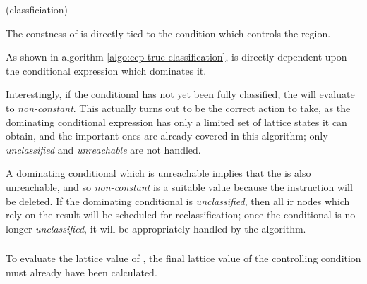 \begin{algorithm}[h!]
  \label{algo:ccp-true-classification}
  \caption{ (classficiation)}
  \begin{algorithmic}[1]
    \STATE{}
    \STATE{}
    \STATE{}
    \ELSE
    \ENDIF
  \end{algorithmic}
\end{algorithm}

\begin{observation}\label{obs:ccp-true-guard}
  The constness of  is directly tied to the condition
  which controls the region.
\end{observation}

As shown in algorithm \ref{algo:ccp-true-classification},
 is directly dependent upon the conditional expression
which dominates it.

Interestingly, if the conditional has not yet been fully classified,
the  will evaluate to \emph{non-constant}.  This
actually turns out to be the correct action to take, as the dominating
conditional expression has only a limited set of lattice states it can
obtain, and the important ones are already covered in this algorithm;
only \emph{unclassified} and \emph{unreachable} are not handled.

A dominating conditional which is unreachable implies that the
 is also unreachable, and so \emph{non-constant} is a
suitable value because the instruction will be deleted.  If the
dominating conditional is \emph{unclassified}, then all \ac{ir} nodes
which rely on the result will be scheduled for reclassification; once
the conditional is no longer \emph{unclassified}, it will be
appropriately handled by the algorithm.

\subsubsection{}
To evaluate the lattice value of , the final
lattice value of the controlling condition must already have been
calculated.

